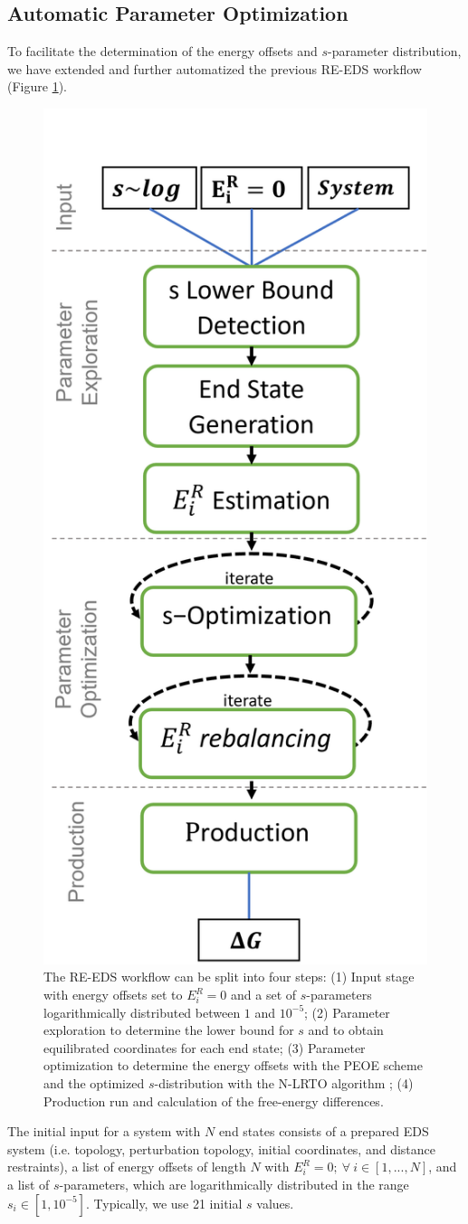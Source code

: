 \subsection{Automatic Parameter Optimization}
To facilitate the determination of the energy offsets and $s$-parameter distribution, we have extended and further automatized the previous \cite{Sidler2017} RE-EDS workflow (Figure \ref{fig:Workflow}).
\begin{figure}[h]
	\centering
	\includegraphics[width=0.5\columnwidth]{fig/theory/RE_EDS_Pipeline.png}
	\caption{The RE-EDS workflow can be split into four steps: (1) Input stage with energy offsets set to $E_i^R=0$ and a set of $s$-parameters logarithmically distributed between $1$ and $10^{-5}$; (2) Parameter exploration to determine the lower bound for $s$ and to obtain equilibrated coordinates for each end state; (3) Parameter optimization to determine the energy offsets with the PEOE scheme \cite{Sidler2016} and the optimized $s$-distribution with the N-LRTO algorithm \cite{Sidler2017} ; (4) Production run and calculation of the free-energy differences.}
	\label{fig:Workflow}
\end{figure}
%
The initial input for a system with $N$ end states consists of a prepared EDS system (i.e. topology,  perturbation topology, initial coordinates, and distance restraints), a list of energy offsets of length $N$ with $E_i^R = 0; ~ \forall ~ i \in [1,...,N]$, and a list of $s$-parameters, which are logarithmically distributed in the range $s_i \in [1, 10^{-5}]$. Typically, we use 21 initial $s$ values. 

